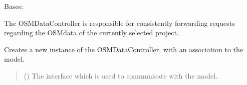 \documentclass[letterpaper,10pt,english]{sphinxmanual}
\begin{document}
\begin{fulllineitems}
\label{\detokenize{apidoc/src.osm_configurator.control:src.osm_configurator.control.osm_data_controller.OSMDataController}}
\pysigstartsignatures
{}
\pysigstopsignatures
\sphinxAtStartPar
Bases: 

\sphinxAtStartPar
The OSMDataController is responsible for consistently forwarding requests
regarding the OSM\sphinxhyphen{}data of the currently selected project.

\begin{fulllineitems}
\label{\detokenize{apidoc/src.osm_configurator.control:src.osm_configurator.control.osm_data_controller.OSMDataController.__init__}}
\pysigstartsignatures
{}
\pysigstopsignatures
\sphinxAtStartPar
Creates a new instance of the OSMDataController, with an association to the model.
\begin{quote}\begin{description}
\sphinxAtStartPar
{} ({\hyperref[\detokenize{apidoc/src.osm_configurator.model.application:src.osm_configurator.model.application.application_interface.IApplication}]{}}) \textendash{} The interface which is used to communicate with the model.

\end{description}\end{quote}

\end{fulllineitems}



\end{fulllineitems}
\end{document}
